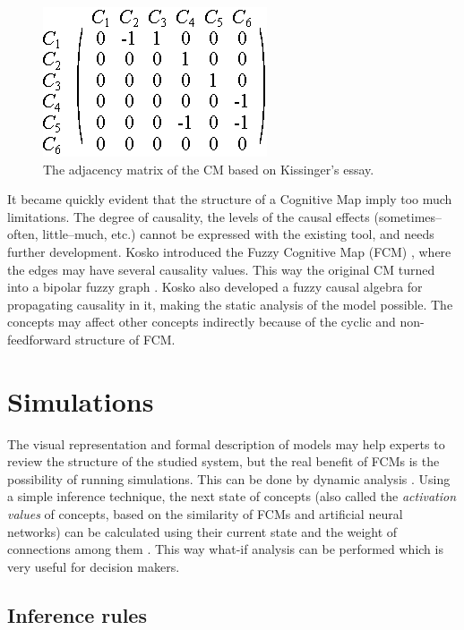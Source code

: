 \documentclass[graybox]{svmult}
\begin{document}
\begin{figure}[hbt]
  \sidecaption
  \includegraphics[scale=1.25]{kissingerMtx}
  \caption{The adjacency matrix of the CM based on Kissinger's essay.}
  \label{fig:kissingerMtx}
\end{figure}

It became quickly evident that the structure of a Cognitive Map imply too much limitations. The degree of causality, the levels of the causal effects (sometimes--often, little--much, etc.) cannot be expressed with the existing tool, and needs further development. Kosko introduced the Fuzzy Cognitive Map (FCM) \cite{b.kosko1986}, where the edges may have several causality values. This way the original CM turned into a bipolar fuzzy graph \cite{zhang1998yin}. Kosko also developed a fuzzy causal algebra for propagating causality in it, making the static analysis of the model possible. The concepts may affect other concepts indirectly because of the cyclic and non-feedforward structure of FCM.

\section{Simulations}
\label{sec:2}

The visual representation and formal description of models may help experts to review the structure of the studied system, but the real benefit of FCMs is the possibility of running simulations. This can be done by dynamic analysis \cite{kosko1988hidden}. Using a simple inference technique, the next state of concepts (also called the \emph{activation values} of concepts, based on the similarity of FCMs and artificial neural networks) can be calculated using their current state and the weight of connections among them \cite{dickerson1994virtual,tsadiras2008comparing}. This way what-if analysis can be performed which is very useful for decision makers.

\subsection{Inference rules}
\end{document}
